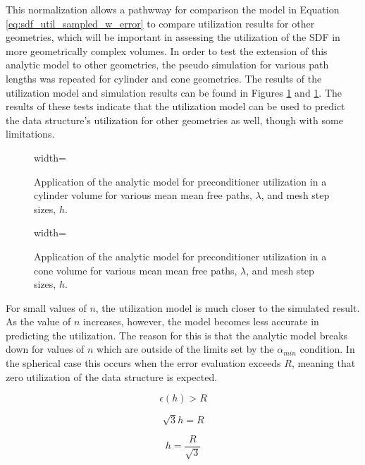 This normalization allows a pathwway for comparison the model in Equation
\ref{eq:sdf_util_sampled_w_error} to compare utilization results for other
geometries, which will be important in assessing the utilization of the SDF in
more geometrically complex volumes. In order to test the extension of this
analytic model to other geometries, the pseudo simulation for various path
lengths was repeated for cylinder and cone geometries. The results of the
utilization model and simulation results can be found in Figures
\ref{fig:sdf_util_sampled_cylinder} and \ref{fig:sdf_util_sampled_cylinder}. The
results of these tests indicate that the utilization model can be used to
predict the data structure's utilization for other geometries as well, though
with some limitations.

\begin{figure}[H]
  \centering
  {width=\textwidth}
  \caption{Application of the analytic model for preconditioner utilization in a
    cylinder volume for various mean mean free paths, $\lambda$, and mesh step
    sizes, $h$.}
  \label{fig:sdf_util_sampled_cylinder}
\end{figure}


\begin{figure}[H]
  \centering
  {width=\textwidth}
  \caption{Application of the analytic model for preconditioner utilization in a
    cone volume for various mean mean free paths, $\lambda$, and mesh step
    sizes, $h$.}
  \label{fig:sdf_util_sampled_cone}
\end{figure}

For small values of $n$, the utilization model is much closer to the simulated
result. As the value of $n$ increases, however, the model becomes less accurate
in predicting the utilization. The reason for this is that the analytic model
breaks down for values of $n$ which are outside of the limits set by the
$\alpha_{min}$ condition. In the spherical case this occurs when the error
evaluation exceeds $R$, meaning that zero utilization of the data structure is
expected.

\begin{equation}
  \epsilon(h) > R
\end{equation}

\begin{equation}
  \sqrt{3}h = R
\end{equation}

\begin{equation}
  h = \frac{R}{\sqrt{3}}
  \label{eq:error_condition_sphere}
\end{equation}

